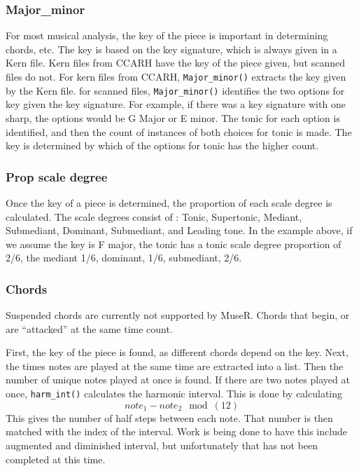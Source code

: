 \documentclass[12pt,twoside]{reedthesis}
\theoremstyle{definition}
\theoremstyle{definition}
\theoremstyle{definition}
\theoremstyle{remark}
\begin{document}
\subsubsection{Major\_minor}\label{major_minor}

For most musical analysis, the key of the piece is important in
determining chords, etc. The key is based on the key signature, which is
always given in a Kern file. Kern files from CCARH have the key of the
piece given, but scanned files do not. For kern files from CCARH,
\texttt{Major\_minor()} extracts the key given by the Kern file. for
scanned files, \texttt{Major\_minor()} identifies the two options for
key given the key signature. For example, if there was a key signature
with one sharp, the options would be G Major or E minor. The tonic for
each option is identified, and then the count of instances of both
choices for tonic is made. The key is determined by which of the options
for tonic has the higher count.

\subsubsection{Prop scale degree}\label{prop-scale-degree}

Once the key of a piece is determined, the proportion of each scale
degree is calculated. The scale degrees consist of : Tonic, Supertonic,
Mediant, Submediant, Dominant, Submediant, and Leading tone. In the
example above, if we assume the key is F major, the tonic has a tonic
scale degree proportion of 2/6, the mediant 1/6, dominant, 1/6,
submediant, 2/6.

\subsubsection{Chords}\label{chords}

Suspended chords are currently not supported by MuseR. Chords that
begin, or are ``attacked'' at the same time count.

First, the key of the piece is found, as different chords depend on the
key. Next, the times notes are played at the same time are extracted
into a list. Then the number of unique notes played at once is found. If
there are two notes played at once, \texttt{harm\_int()} calculates the
harmonic interval. This is done by calculating
\[note_1 - note_2 \mod(12)\] This gives the number of half steps between
each note. That number is then matched with the index of the interval.
Work is being done to have this include augmented and diminished
interval, but unfortunately that has not been completed at this time.
\end{document}
